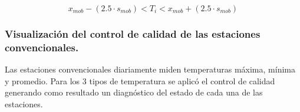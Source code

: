 \begin{enumerate}
\begin{equation}\label{eq:Saltos}
	     x_{mob} - (2.5\cdot{s_{mob}}) < T_{i} < x_{mob} + (2.5\cdot{s_{mob}}) 
\end{equation}









\end{enumerate}

\subsubsection{Visualización del control de calidad de las estaciones convencionales.}

Las estaciones convencionales diariamente miden temperaturas máxima, mínima y promedio. Para los 3 tipos de temperatura se aplicó el control de calidad generando como resultado un diagnóstico del estado de cada una de las estaciones.\\

